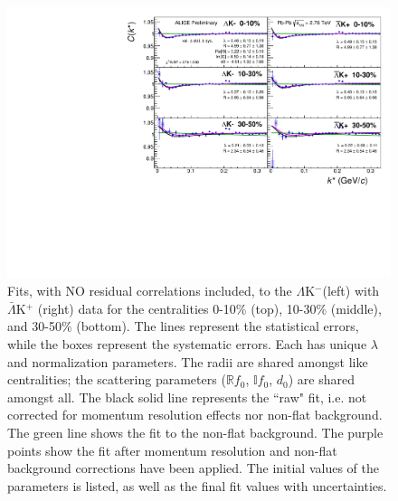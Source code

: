 \documentclass[../AnalysisNoteJBuxton.tex]{subfiles}
\begin{document}
\begin{figure}[h]
  \centering
  \includegraphics[width=\textwidth]{7_ResultsAndDiscussion/Figures/canKStarCfwFitsLamKchMwConj_0010_1030_3050_MomResCrctn_NonFlatBgdCrctn_NoRes.pdf}
  \caption[$\Lambda$K$^{-}$($\bar{\Lambda}$K$^{+}$) Fits with No Residuals]{Fits, with NO residual correlations included, to the $\Lambda$K$^{-}$(left) with $\bar{\Lambda}$K$^{+}$ (right) data for the centralities 0-10\% (top), 10-30\% (middle), and 30-50\% (bottom).
The lines represent the statistical errors, while the boxes represent the systematic errors.  
Each has unique $\lambda$ and normalization parameters.
The radii are shared amongst like centralities; the scattering parameters ($\mathbb{R}f_{0}$, $\mathbb{I}f_{0}$, $d_{0}$) are shared amongst all.
The black solid line represents the ``raw" fit, i.e. not corrected for momentum resolution effects nor non-flat background.  
The green line shows the fit to the non-flat background.
The purple points show the fit after momentum resolution and non-flat background corrections have been applied.
The initial values of the parameters is listed, as well as the final fit values with uncertainties.}
  \label{fig:LamKchMwConjFits_NoRes}
\end{figure}
\end{document}
